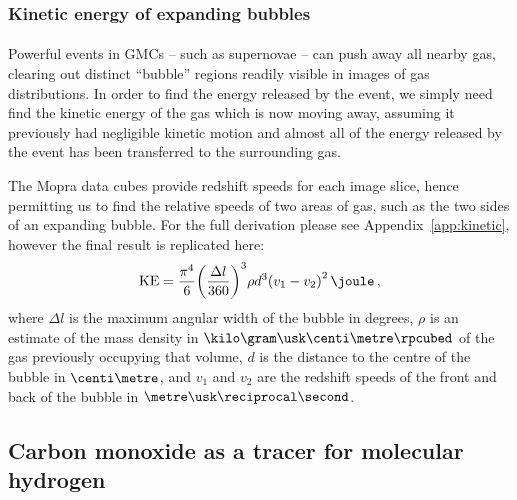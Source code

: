\documentclass[a4paper, titlepage, oneside]{article}
\begin{document}
\begin{multicols}{2}
\subsubsection{Kinetic energy of expanding bubbles}
\label{sec:kinetic}
\paragraph{}
Powerful events in GMCs -- such as supernovae -- can push away all nearby gas, clearing out distinct ``bubble'' regions readily visible in images of gas distributions. In order to find the energy released by the event, we simply need find the kinetic energy of the gas which is now moving away, assuming it previously had negligible kinetic motion and almost all of the energy released by the event has been transferred to the surrounding gas.

The Mopra data cubes provide redshift speeds for each image slice, hence permitting us to find the relative speeds of two areas of gas, such as the two sides of an expanding bubble. For the full derivation please see Appendix~\ref{app:kinetic}, however the final result is replicated here:
\begin{equation}
  \mathrm{KE} = \frac{\pi ^ 4}{6} {\left( \frac{\Delta l}{360} \right)}^3 \rho d^3 {(v_1 - v_2)}^2 \, \joule \, ,
\end{equation}
where \(\Delta l\) is the maximum angular width of the bubble in degrees, \(\rho\) is an estimate of the mass density in \(\kilo\gram\usk\centi\metre\rpcubed\) of the gas previously occupying that volume, \(d\) is the distance to the centre of the bubble in \(\centi\metre\), and \(v_1\) and \(v_2\) are the redshift speeds of the front and back of the bubble in \(\metre\usk\reciprocal\second\).

\subsection{Carbon monoxide as a tracer for molecular hydrogen}
\label{sec:co}

\end{multicols}
\end{document}
